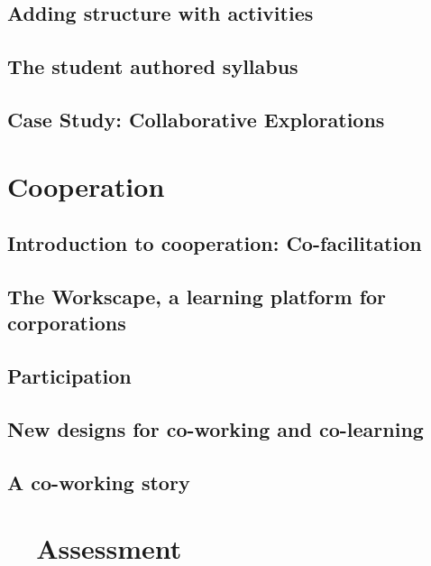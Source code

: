 \documentclass[ebook, 12pt, twoside]{memoir}
\begin{document}
\chapter[\textbf{Adding structure}]{Adding structure with activities}
%

%
\chapter[\textbf{The student authored syllabus}]{ The student authored syllabus } 
%

%
\chapter[\textbf{Case Study: Collaborative Explorations}]{ Case Study: Collaborative Explorations}
%


\part{Cooperation} \label{cooperation-part} %
%
\chapter[\textbf{Co-facilitation}]{Introduction to cooperation: Co-facilitation}

%
\chapter[\textbf{The Workscape}]{ The Workscape, a learning platform for corporations }
%

\chapter[\textbf{Participation}]{ Participation }
%

%
\chapter[\textbf{Designs for co-working}]{New designs for co-working and co-learning}
%

%
\chapter[\textbf{A co-working story}]{A co-working story}
%



\part{~~Assessment} \label{assessment-part} %
%
\end{document}

